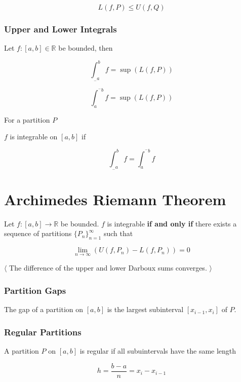 \documentclass[12pt,letterpaper]{article}
\newcommand{\R}{{\mathbb R}}
\newcommand{\btw}[1]{
    $\langle$ #1 $\rangle$
}
\begin{document}
\begin{multicols*}{2}
        \[
          L(f, P) \le U(f, Q)
        \]


        \subsubsection{Upper and Lower Integrals}

        Let $f: [a, b] \in \R$ be bounded, then

        \begin{multicols}{2}
          \[
            \int_{_{-}a}^{b} f = \sup(L(f, P))
          \]

          \[
            \int_{a}^{^{-}b} f = \sup(L(f, P))
          \]
        \end{multicols}

        For a partition $P$

        $f$ is integrable on $[a, b]$ if

        \[
            \int_{_{-}a}^{b} f = \int_{a}^{^{-}b} f
        \]


        \section{Archimedes Riemann Theorem}

        Let $f: [a, b] \rightarrow \R$ be bounded. $f$ is integrable {\bf if and
        only if} there exists a sequence of partitions $\{P_n\}_{n =
        1}^{\infty}$ such that

        \[
          \lim_{n \to \infty} (U(f, P_n) - L(f, P_n)) = 0
        \]

        \btw {The difference of the upper and lower Darboux sums converges.}


        \subsubsection{Partition Gaps}

        The gap of a partition on $[a, b]$ is the largest subinterval $[x_{i -
        1}, x_i]$ of $P$.

        \subsubsection{Regular Partitions}

        A partition $P$ on $[a, b]$ is regular if all subuintervals have the same length

        \[
          h = \frac{b - a}{n} = x_i - x_{i - 1}
        \]


\end{multicols*}
\end{document}
